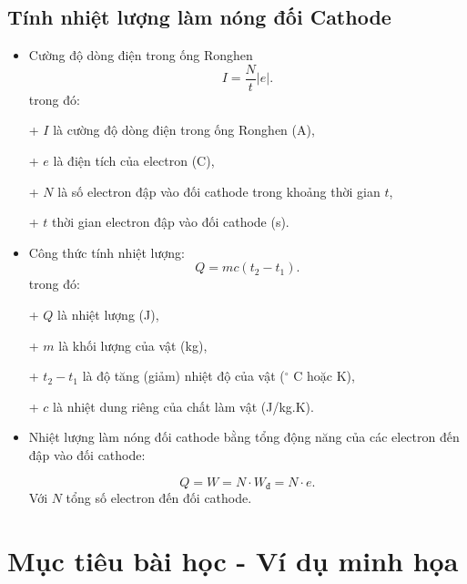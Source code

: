 \subsection{Tính nhiệt lượng làm nóng đối Cathode}

\begin{itemize}
	\item Cường độ dòng điện trong ống Ronghen 
	\begin{equation}
		I = \dfrac{N}{t}|e|.
	\end{equation}
	trong đó:
	
	+ $I$ là cường độ dòng điện trong ống Ronghen (A),
	
	+ $e$ là điện tích của electron (C),
	
	+ $N$ là số electron đập vào đối cathode trong khoảng thời gian $t$,
	
	+ $t$ thời gian electron đập vào đối cathode (s).
	\item Công thức tính nhiệt lượng: 
	\begin{equation}
		Q=mc(t_2-t_1).
	\end{equation}
	trong đó:
	
	+ $Q$ là nhiệt lượng (J),
	
	+ $m$ là khối lượng của vật (kg),
	
	+ $t_2-t_1$ là độ tăng (giảm) nhiệt độ của vật ($^\circ$ C hoặc K),
	
	+ $c$ là nhiệt dung riêng của chất làm vật (J/kg.K).
	\item Nhiệt lượng làm nóng đối cathode bằng tổng động năng của các electron đến đập vào đối cathode:
	
	\begin{equation}
		Q = W = N\cdot W_{\text{đ}} = N\cdot e.
	\end{equation}
	Với $N$ tổng số  electron đến đối cathode.
	
\end{itemize}

\section{Mục tiêu bài học - Ví dụ minh họa}

